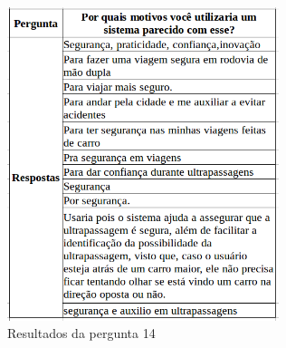 \begin{itemize}
\begin{figure}[h]
  \centering
  \includegraphics[width=300px, scale=1]{figuras/quadro2}
  \caption{Resultados da pergunta 14}
\label{fig:quadro2}
\end{figure}	

\end{itemize}